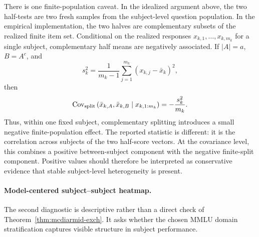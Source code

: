 \documentclass[11pt]{article}
\theoremstyle{definition}
\theoremstyle{remark}
\begin{document}
There is one finite-population caveat.  In the idealized argument above, the two half-tests are two fresh samples from the subject-level question population.  In the empirical implementation, the two halves are complementary subsets of the realized finite item set.  Conditional on the realized responses \(x_{k,1},\ldots,x_{k,m_k}\) for a single subject, complementary half means are negatively associated.  If \(|A|=a\), \(B=A^c\), and
\[
    s_k^2
    =
    \frac1{m_k-1}
    \sum_{j=1}^{m_k}
    (x_{k,j}-\bar x_k)^2,
\]
then
\[
    \operatorname{Cov}_{\rm split}
    \left(
        \bar x_{k,A},
        \bar x_{k,B}
        \mid x_{k,1:m_k}
    \right)
    =
    -\frac{s_k^2}{m_k}.
\]
Thus, within one fixed subject, complementary splitting introduces a small negative finite-population effect.  The reported statistic is different: it is the correlation across subjects of the two half-score vectors.  At the covariance level, this combines a positive between-subject component with the negative finite-split component.  Positive values should therefore be interpreted as conservative evidence that stable subject-level heterogeneity is present.

\paragraph{Model-centered subject--subject heatmap.}

The second diagnostic is descriptive rather than a direct check of Theorem~\ref{thm:mcdiarmid-exch}.  It asks whether the chosen MMLU domain stratification captures visible structure in subject performance. 
\end{document}
